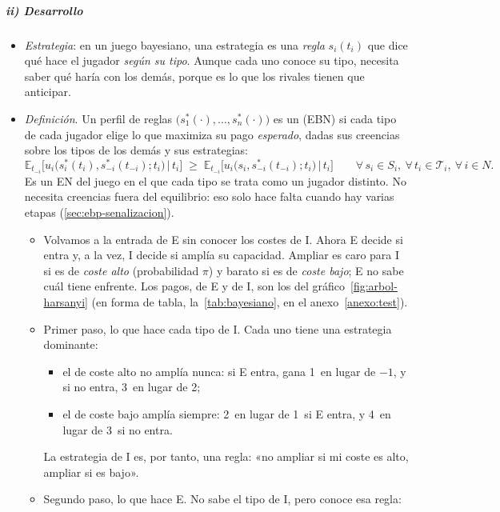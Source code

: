 \documentclass[11pt]{article}
\begin{document}
\subparagraph{ii) Desarrollo}

\begin{itemize}
\item \emph{Estrategia}: en un juego bayesiano, una estrategia es una \emph{regla} $s_i(t_i)$ que dice qué hace el jugador \emph{según su tipo}. Aunque cada uno conoce su tipo, necesita saber qué haría con los demás, porque es lo que los rivales tienen que anticipar.
\item \emph{Definición}. Un perfil de reglas $\big(s_1^*(\cdot),\dots,s_n^*(\cdot)\big)$ es un  (EBN) si cada tipo de cada jugador elige lo que maximiza su pago \emph{esperado}, dadas sus creencias sobre los tipos de los demás y sus estrategias:
\[
\mathbb{E}_{t_{-i}}\Big[u_i\big(s_i^*(t_i),s_{-i}^*(t_{-i});t_i\big)\,\Big|\,t_i\Big]\;\geq\;\mathbb{E}_{t_{-i}}\Big[u_i\big(s_i,s_{-i}^*(t_{-i});t_i\big)\,\Big|\,t_i\Big]\qquad\forall\,s_i\in S_i,\ \forall\,t_i\in\mathcal{T}_i,\ \forall\,i\in N.
\]
  Es un EN del juego en el que cada tipo se trata como un jugador distinto. No necesita creencias fuera del equilibrio: eso solo hace falta cuando hay varias etapas (\ref{sec:ebp-senalizacion}).
  \begin{itemize}
  \item Volvamos a la entrada de E sin conocer los costes de \textup{I}. Ahora E decide si entra y, a la vez, \textup{I} decide si amplía su capacidad. Ampliar es caro para \textup{I} si es de \emph{coste alto} (probabilidad $\pi$) y barato si es de \emph{coste bajo}; E no sabe cuál tiene enfrente. Los pagos, de E y de \textup{I}, son los del gráfico~\ref{fig:arbol-harsanyi} (en forma de tabla, la~\ref{tab:bayesiano}, en el anexo~\ref{anexo:test}).
  \item Primer paso, lo que hace cada tipo de \textup{I}. Cada uno tiene una estrategia dominante:
    \begin{itemize}
    \item el de coste alto no amplía nunca: si E entra, gana 1~en lugar de $-1$, y si no entra, 3~en lugar de 2;
    \item el de coste bajo amplía siempre: 2~en lugar de 1~si E entra, y 4~en lugar de 3~si no entra.
    \end{itemize}
    La estrategia de \textup{I} es, por tanto, una regla: «no ampliar si mi coste es alto, ampliar si es bajo».
  \item Segundo paso, lo que hace E. No sabe el tipo de \textup{I}, pero conoce esa regla:
    \begin{itemize}

\end{itemize}
\end{itemize}
\end{itemize}
\end{document}
